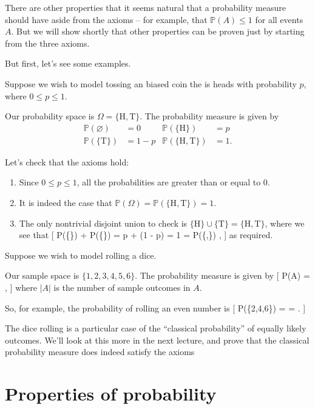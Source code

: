 \documentclass[
  letterpaper,
]{report}
\providecommand{\tightlist}{%
  \setlength{\itemsep}{0pt}\setlength{\parskip}{0pt}}\usepackage{longtable,booktabs,array}
\theoremstyle{definition}
\theoremstyle{definition}
\theoremstyle{remark}
\begin{document}
There are other properties that it seems natural that a probability
measure should have aside from the axioms -- for example, that
\(\mathbb P(A) \leq 1\) for all events \(A\). But we will show shortly
that other properties can be proven just by starting from the three
axioms.

But first, let's see some examples.

Suppose we wish to model tossing an biased coin the is heads with
probability \(p\), where \(0 \leq p \leq 1\).

Our probability space is \(\Omega = \{\text{H}, \text{T}\}\). The
probability measure is given by \begin{align*}
   \mathbb P(\varnothing) &= 0  &  \mathbb P(\{\text{H}\}) &= p \\
   \mathbb P(\{\text{T}\}) &= 1 - p  &  \mathbb P(\{\text{H},\text{T}\})  &= 1 .
\end{align*}

Let's check that the axioms hold:

\begin{enumerate}
\def\labelenumi{\arabic{enumi}.}
\tightlist
\item
  Since \(0 \leq p \leq 1\), all the probabilities are greater than or
  equal to 0.
\item
  It is indeed the case that
  \(\mathbb P(\Omega) = \mathbb P(\{\text{H},\text{T}\}) = 1\).
\item
  The only nontrivial disjoint union to check is
  \(\{\text{H}\} \cup \{\text{T}\} = \{\text{H},\text{T}\}\), where we
  see that {[} \mathbb P(\{\}) + \mathbb P(\{\}) = p +
  (1 - p) = 1 = \mathbb P(\{,\}) , {]} as required.
\end{enumerate}

Suppose we wish to model rolling a dice.

Our sample space is \(\{1,2,3,4,5,6\}\). The probability measure is
given by {[} \mathbb P(A) =  , {]} where \(|A|\) is the
number of sample outcomes in \(A\).

So, for example, the probability of rolling an even number is {[}
\mathbb P(\{2,4,6\}) =  =  . {]}

The dice rolling is a particular case of the ``classical probability''
of equally likely outcomes. We'll look at this more in the next lecture,
and prove that the classical probability measure does indeed satisfy the
axioms

\hypertarget{prob-properties}{%
\section{Properties of probability}\label{prob-properties}}
\end{document}
